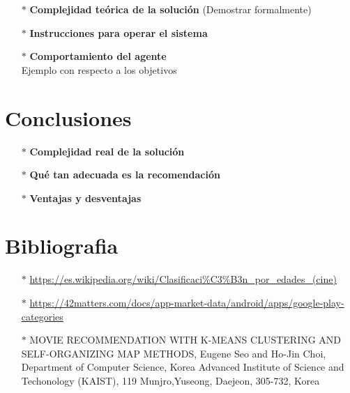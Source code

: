 \documentclass[10pt, a4paper]{article}
\begin{document}
\begin{enumerate}
\begin{enumerate}
\item[$\bullet$]Observable: Totalmente, la app tiene acceso a todos los componentes de la interf\'az gr\'afica, as\'i como a la base de datos.
\item[$\bullet$]Determinista / Estoc\'astico: Estoc\'astico, pues la decisi\'on futura (hacer una recomendaci\'on) depende de las aplicaciones que el usuario seleccion\'o anteriormente. 
\item[$\bullet$]Epis\'odico / Secuencial: Secuencial, pues dependiendo de las aplicaciones que seleccion\'o como sus favoritas, afectar\'an el c\'alculo de su recomendaci\'on. 
\item[$\bullet$]Discreto / Continuo: Discreto, pues se debe esperar a que el usuario seleccione sus gustos para poder hacer la recomendaci\'on. 
\item[$\bullet$]Est\'atico / Din\'amico: Est\'atico, el entorno de trabajo no cambia, siempre se usa el mismo dataset 
\item[$\bullet$]Agente: Multiagente, hay una interacci\'on entre el usuario y el software
\end{enumerate}
\item[$\ast$]\textbf{Complejidad teórica de la solución} (Demostrar formalmente)
\item[$\ast$]\textbf{Instrucciones para operar el sistema}\\
\item[$\ast$]\textbf{Comportamiento del agente} \\
Ejemplo con respecto a los objetivos 
\end{enumerate}
\section{Conclusiones}
\begin{enumerate}
\item[$\ast$]\textbf{Complejidad real de la soluci\'on}
\item[$\ast$]\textbf{Qué tan adecuada es la recomendaci\'on}
\item[$\ast$]\textbf{Ventajas y desventajas}
\end{enumerate}
\section{Bibliografia}
\begin{enumerate}
\item[$\ast$]\url{https://es.wikipedia.org/wiki/Clasificaci%C3%B3n_por_edades_(cine)}
\item[$\ast$]\url{https://42matters.com/docs/app-market-data/android/apps/google-play-categories}
\item[$\ast$]MOVIE RECOMMENDATION WITH K-MEANS CLUSTERING AND SELF-ORGANIZING MAP METHODS, Eugene Seo and Ho-Jin Choi, Department of Computer Science, Korea Advanced Institute of Science and Techonology (KAIST), 119 Munjro,Yuseong, Daejeon, 305-732, Korea
\end{enumerate}
\end{document}
